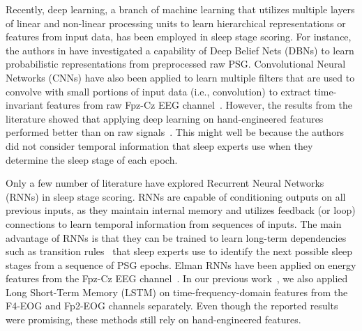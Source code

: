 \documentclass[journal,twoside]{IEEEtran}
\begin{document}
Recently, deep learning, a branch of machine learning that utilizes multiple layers of linear and non-linear processing units to learn hierarchical representations or features from input data, has been employed in sleep stage scoring. For instance, the authors in \cite{langkvist2012} have investigated a capability of Deep Belief Nets (DBNs) to learn probabilistic representations from preprocessed raw PSG. Convolutional Neural Networks (CNNs) have also been applied to learn multiple filters that are used to convolve with small portions of input data (i.e., convolution) to extract time-invariant features from raw Fpz-Cz EEG channel~\cite{tsinalis2016cnn}. However, the results from the literature showed that applying deep learning on hand-engineered features performed better than on raw signals~\cite{langkvist2012,tsinalis2016}. This might well be because the authors did not consider temporal information that sleep experts use when they determine the sleep stage of each epoch.

Only a few number of literature have explored Recurrent Neural Networks (RNNs) in sleep stage scoring. RNNs are capable of conditioning outputs on all previous inputs, as they maintain internal memory and utilizes feedback (or loop) connections to learn temporal information from sequences of inputs. The main advantage of RNNs is that they can be trained to learn long-term dependencies such as transition rules~\cite{iber2007} that sleep experts use to identify the next possible sleep stages from a sequence of PSG epochs. Elman RNNs have been applied on energy features from the Fpz-Cz EEG channel~\cite{hsu2013}. In our previous work~\cite{dong2016lstm}, we also applied Long Short-Term Memory (LSTM) on time-frequency-domain features from the F4-EOG and Fp2-EOG channels separately. Even though the reported results were promising, these methods still rely on hand-engineered features.
\end{document}
